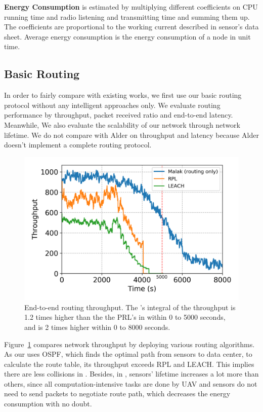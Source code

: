 \textbf{Energy Consumption} is estimated by multiplying different coefficients on
CPU running time and radio listening and transmitting time and summing them up.
The coefficients are proportional to the working current described in sensor's
data sheet. Average energy consumption is the energy consumption of a node in
unit time.

\subsection{Basic Routing}

In order to fairly compare with existing works, we first use our basic
{\sdn} routing protocol without any intelligent approaches only. We evaluate routing
performance by throughput, packet received ratio and end-to-end latency.
Meanwhile, We also evaluate the scalability of our network through network
lifetime. We do not compare {\sdn} with Alder on throughput and latency because
Alder doesn't implement a complete routing protocol.

\begin{figure}[!h]
	\centering
	\includegraphics[width=.95\columnwidth]{Figure/throughput}
	\vspace{-0.1in}
	\caption{End-to-end routing throughput.
		\textnormal{
			The {\sdn}'s integral of the throughput is 1.2 times higher than the
			the PRL's in within 0 to 5000 seconds, and is 2 times higher within 0
			to 8000 seconds.
	}}
	\label{fig:throughput}
\end{figure}

Figure~\ref{fig:throughput} compares network throughput by deploying various
routing algorithms. As our {\sdn} uses OSPF, which finds the optimal path from
sensors to data center, to calculate the route table, its throughput exceeds RPL
and LEACH. This implies there are less collisions in {\sdn}. Besides, 
in {\sdn}, sensors' lifetime increases a lot more than
others, since all computation-intensive tasks are done by UAV and sensors do
not need to send packets to negotiate route path, which decreases the energy
consumption with no doubt.

